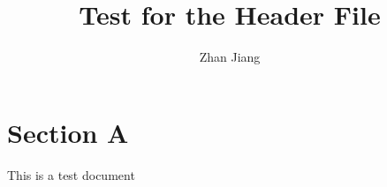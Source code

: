 


\title{Test for the Header File}
\author{Zhan Jiang}

\maketitle

\section{Section A}
This is a test document
